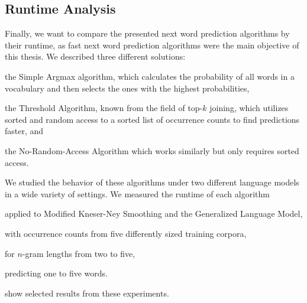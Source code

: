 \clearpage
\subsection{Runtime Analysis}
\label{subsec:evaluation-topkjoin-time}

Finally, we want to compare the presented next word prediction algorithms by
their runtime, as fast next word prediction algorithms were the main objective
of this thesis.
We described three different solutions:
\begin{inparaenum}[(1)]
  \item the Simple Argmax algorithm, which calculates the probability of all
    words in a vocabulary and then selects the ones with the highest
    probabilities,
  \item the Threshold Algorithm, known from the field of top-$k$ joining,
    which utilizes sorted and random access to a sorted list of occurrence
    counts to find predictions faster, and
  \item the No-Random-Access Algorithm which works similarly but only requires
    sorted access.
\end{inparaenum}

We studied the behavior of these algorithms under two different language models
in a wide variety of settings.
We measured the runtime of each algorithm
\begin{inparaenum}[(1)]
  \item applied to Modified Kneser-Ney Smoothing and the Generalized Language
    Model,
  \item with occurrence counts from five differently sized training corpora,
  \item for $n$-gram lengths from two to five,
  \item predicting one to five words.
\end{inparaenum}
show selected results from these experiments.

